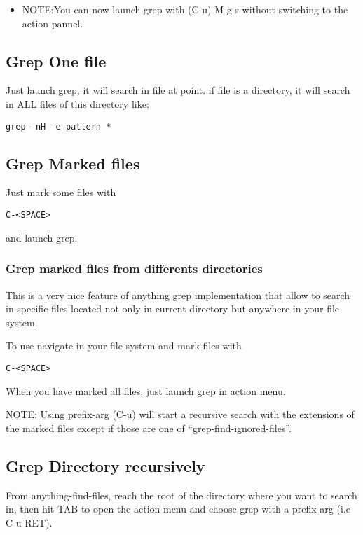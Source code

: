 \documentclass[a4paper,11pt]{article}
\begin{document}
\begin{itemize}
\item NOTE:You can now launch grep with (C-u) M-g s without switching to the action pannel.
\end{itemize}

\subsection{Grep One file}
\label{sec:grep-one-file}
Just launch grep, it will search in file at point.
if file is a directory, it will search in ALL files of this directory like:

\begin{verbatim}
grep -nH -e pattern *
\end{verbatim}


\subsection{Grep Marked files}
\label{sec:grep-marked-files}
Just mark some files with
\begin{verbatim}
C-<SPACE>
\end{verbatim}
and launch grep.
\subsubsection{Grep marked files from differents directories}
\label{sec:grep-marked-files-1}
This is a very nice feature of anything grep implementation that allow to search in specific files located not
only in current directory but anywhere in your file system.

To use navigate in your file system and mark files with 
\begin{verbatim}
C-<SPACE> 
\end{verbatim}
When you have marked all files, just launch grep in action menu.

NOTE: Using prefix-arg (C-u) will start a recursive search with the extensions of the marked files
except if those are one of ``grep-find-ignored-files''.  

\subsection{Grep Directory recursively}
\label{sec:grep-direct-recurs}
From anything-find-files, reach the root of the directory where you want to search in,
then hit TAB to open the action menu and choose grep with a prefix arg (i.e C-u RET).
\end{document}
